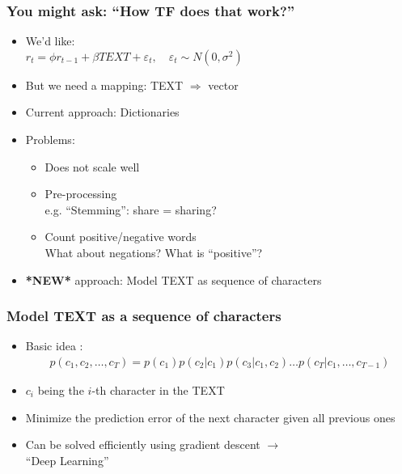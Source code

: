 \documentclass{beamer}
\begin{document}
\begin{frame}
  \frametitle{You might ask: ``How TF does that work?''}
  \begin{itemize}
   \item We'd like: \\ 
     $r_t = \phi r_{t-1} + \beta TEXT + \varepsilon_t, \quad \varepsilon_t \sim N(0,\sigma^2)$

    \item But we need a mapping: TEXT $\Rightarrow$ vector 
    \item Current approach: Dictionaries \citep{loughran2011liability}
    \item Problems:
      \begin{itemize}
      \item Does not scale well
      \item Pre-processing\\
        e.g. ``Stemming'': share = sharing?
      \item Count positive/negative words\\
        What about negations? What is ``positive''?
      \end{itemize}
    \item \textbf{*NEW*} approach: Model TEXT as sequence of characters
  \end{itemize}
\end{frame}

\begin{frame}
  \frametitle{Model TEXT as a sequence of characters}
  \begin{itemize}
  \item Basic idea \citep{krause2016mlstm}:\\
    \begin{align*}
      \label{eq:1}
      p(c_1, c_2, \dots, c_T) = p(c_1) p(c_2|c_1) p(c_3 | c_1, c_2) \dots p(c_T|c_1, \dots, c_{T-1})
    \end{align*}
  \item $c_i$ being the $i$-th character in the TEXT
  \item Minimize the prediction error of the next character given all previous ones
  \item Can be solved efficiently using gradient descent $\rightarrow$ \\ ``Deep Learning''
  \end{itemize} 
\end{frame}
\end{document}
